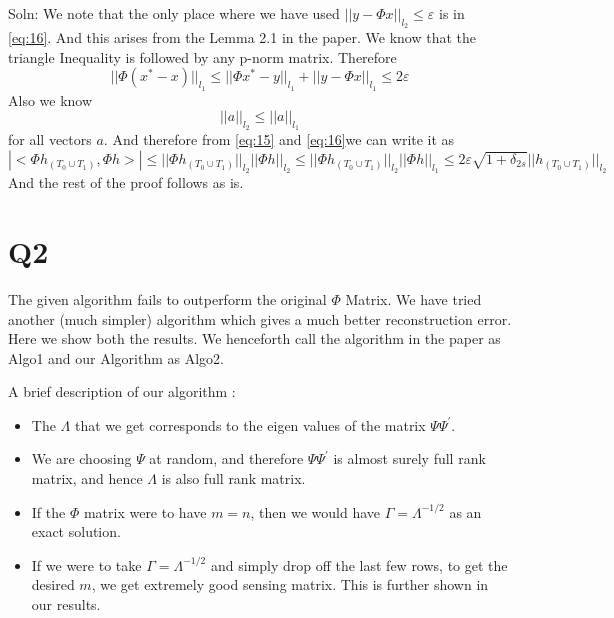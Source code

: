 \documentclass{article}
\newcommand{\lone}[1]{
  ||#1||_{l_1}
}
\newcommand{\ltwo}[1]{
  ||#1||_{l_2}
}
\newcommand{\htzo}{
  h_{(T_0 \cup T_1)}
}
\begin{document}
Soln:
We note that the only place where we have used $\ltwo{y - \Phi x} \le \varepsilon$ is in \ref{eq:16}. And this arises from the Lemma 2.1 in the paper.
We know that the triangle Inequality is followed by any p-norm matrix. Therefore
$$\lone{\Phi(x^* - x)} \le \lone{\Phi x^* - y} + \lone{y - \Phi x} \le 2\varepsilon$$
Also we know
$$\ltwo{a} \le \lone{a}$$ for all vectors $a$.
And therefore from \ref{eq:15} and \ref{eq:16}we can write it as
$$|<\Phi\htzo,\Phi h>| \le \ltwo{\Phi\htzo}\ltwo{\Phi h} \le \ltwo{\Phi\htzo}\lone{\Phi h} \le 2 \varepsilon \sqrt{1+\delta_{2s}}\ltwo{\htzo}$$
And the rest of the proof follows as is.
\newpage
\section*{Q2}

The given algorithm fails to outperform the original $\Phi$ Matrix. We have tried another (much simpler) algorithm which gives a much better reconstruction error. Here we show both the results. We henceforth call the algorithm in the paper as Algo1 and our Algorithm as Algo2.

A brief description of our algorithm :
\begin{itemize}
\item The $\Lambda$ that we get corresponds to the eigen values of the matrix $\Psi \Psi^{'}$.
\item We are choosing $\Psi$ at random, and therefore $\Psi \Psi^{'}$ is almost surely full rank matrix, and hence $\Lambda$ is also full rank matrix.
\item If the $\Phi$ matrix were to have $m=n$, then we would have $\Gamma = \Lambda^{-1/2}$ as an exact solution.
\item If we were to take $\Gamma = \Lambda^{-1/2}$ and simply drop off the last few rows, to get the desired $m$, we get extremely good sensing matrix. This is further shown in our results.
\end{itemize}
\end{document}
